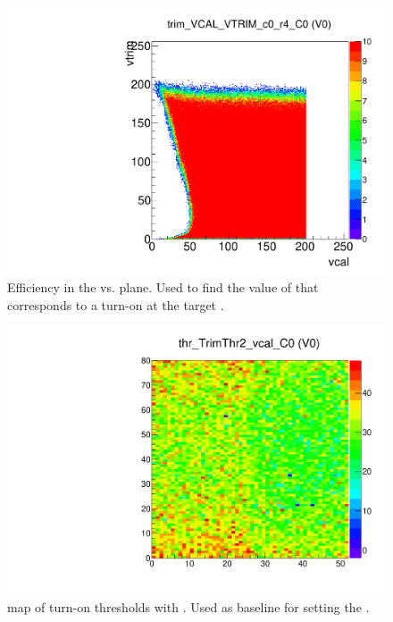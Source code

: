 
\begin{figure}[!htp]
\centering
\begin{minipage}{0.45\textwidth}
  \includegraphics[width=1.0\textwidth]{figures/trim_trim_VCAL_VTRIM.pdf}
  \caption{Efficiency in the \vtrim vs. \vcal plane.
           Used to find the value of \vtrim that corresponds to a turn-on at the target \vcal.}
  \label{fig:trim_trim_VCAL_VTRIM}
\end{minipage}
\end{figure}


\begin{figure}[!htp]
\centering
\begin{minipage}{0.45\textwidth}
  \includegraphics[width=1.0\textwidth]{figures/trim_thr_TrimThr2_vcal.pdf}
  \caption{\roc map of \vcal turn-on thresholds with .
           Used as baseline for setting the \trimbits.}
  \label{fig:trim_thr_TrimThr2_vcal}
\end{minipage}
\end{figure}

